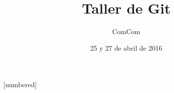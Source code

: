 
%
%
%
{
  [numbered]
}

\usepackage[spanish]{babel}
\usepackage[utf8x]{inputenc}
\usepackage{hyperref}
\usepackage{coloremoji} %
\usepackage{caption}
\captionsetup[figure]{labelformat=empty}

\hypersetup{
    colorlinks=true,       %
    linkcolor=white,          %
    citecolor=green,        %
    filecolor=magenta,      %
    urlcolor=cyan           %
}

\title{Taller de Git}
\author{ComCom}
\date{25 y 27 de abril de 2016}



\newenvironment{ejercicio}[1]{
\begin{exampleblock}{#1}
}{
\end{exampleblock}
}

\newenvironment{resumen}[1]{
\setbeamercolor{block title}{bg=git, fg=white}
\begin{block}{#1}
}{
\end{block}
}

\newenvironment{comando}{
\setbeamercolor{block body}{bg=git, fg=white}
\begin{block}{}
\begin{center}
\LARGE
\begin{texttt}
}{
\end{texttt}
\end{center}
\end{block}
}

